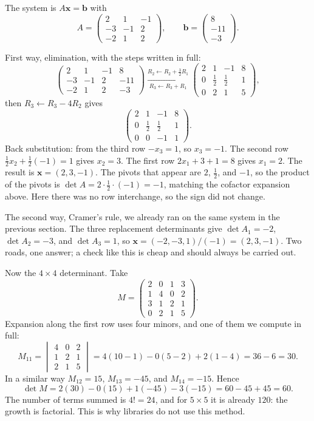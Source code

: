 The system is $A\mathbf{x}=\mathbf{b}$ with
\[
  A=\begin{pmatrix}2&1&-1\\ -3&-1&2\\ -2&1&2\end{pmatrix},
  \qquad \mathbf{b}=\begin{pmatrix}8\\ -11\\ -3\end{pmatrix}.
\]

First way, elimination, with the steps written in full:
\[
  \left(\begin{array}{ccc|c}2&1&-1&8\\ -3&-1&2&-11\\ -2&1&2&-3\end{array}\right)
  \xrightarrow[R_{3}\leftarrow R_{3}+R_{1}]{R_{2}\leftarrow R_{2}+\tfrac{3}{2}R_{1}}
  \left(\begin{array}{ccc|c}2&1&-1&8\\ 0&\tfrac{1}{2}&\tfrac{1}{2}&1\\
  0&2&1&5\end{array}\right),
\]
then $R_{3}\leftarrow R_{3}-4R_{2}$ gives
\[
  \left(\begin{array}{ccc|c}2&1&-1&8\\ 0&\tfrac{1}{2}&\tfrac{1}{2}&1\\
  0&0&-1&1\end{array}\right).
\]
Back substitution: from the third row $-x_{3}=1$, so $x_{3}=-1$. The second row
$\tfrac{1}{2}x_{2}+\tfrac{1}{2}(-1)=1$ gives $x_{2}=3$. The first row $2x_{1}+3+1=8$ gives
$x_{1}=2$. The result is $\mathbf{x}=(2,3,-1)$. The pivots that appear are $2$, $\tfrac{1}{2}$,
and $-1$, so the product of the pivots is $\det A=2\cdot\tfrac{1}{2}\cdot(-1)=-1$, matching the
cofactor expansion above. Here there was no row interchange, so the sign did not change.

The second way, Cramer's rule, we already ran on the same system in the previous section. The
three replacement determinants give $\det A_{1}=-2$, $\det A_{2}=-3$, and $\det A_{3}=1$, so
$\mathbf{x}=(-2,-3,1)/(-1)=(2,3,-1)$. Two roads, one answer; a check like this is cheap and
should always be carried out.

Now the $4\times4$ determinant. Take
\[
  M=\begin{pmatrix}2&0&1&3\\ 1&4&0&2\\ 3&1&2&1\\ 0&2&1&5\end{pmatrix}.
\]
Expansion along the first row uses four minors, and one of them we compute in full:
\[
  M_{11}=\begin{vmatrix}4&0&2\\ 1&2&1\\ 2&1&5\end{vmatrix}
  =4(10-1)-0(5-2)+2(1-4)=36-6=30 .
\]
In a similar way $M_{12}=15$, $M_{13}=-45$, and $M_{14}=-15$. Hence
\[
  \det M=2(30)-0(15)+1(-45)-3(-15)=60-45+45=60 .
\]
The number of terms summed is $4!=24$, and for $5\times5$ it is already $120$: the growth is
factorial. This is why libraries do not use this method.

